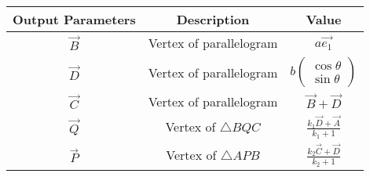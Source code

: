 \begin{tabular}{|c|c|c|}
\hline
    \textbf{Output Parameters} &\textbf{Description} &\textbf{Value} \\
    \hline
     $\vec{B}$ &Vertex of parallelogram&$a\vec{e_1}$\\
      \hline
     $\vec{D}$ &Vertex of parallelogram &$b\begin{pmatrix} \cos{\theta}\\\sin{\theta}
     \end{pmatrix}$\\
     \hline
     $\vec{C}$&Vertex of parallelogram&$\vec{B}+\vec{D}$\\
     \hline
      $\vec{ Q}$ &Vertex of $\triangle BQC$&$\frac{k_1\vec{D}+\vec{A}}{k_1+1}$\\
     \hline
      $\vec{P}$ &Vertex of $\triangle APB$&$\frac{k_2\vec{C}+\vec{D}}{k_2+1}$\\
   \hline
\end{tabular}
